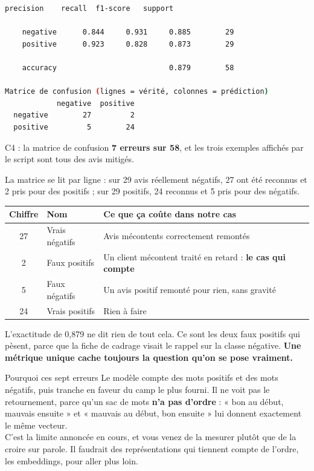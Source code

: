 \documentclass[11pt,a4paper]{article}
\begin{document}
\begin{lstlisting}[language=bash]
              precision    recall  f1-score   support

    negative      0.844     0.931     0.885        29
    positive      0.923     0.828     0.873        29

    accuracy                          0.879        58

Matrice de confusion (lignes = vérité, colonnes = prédiction)
            negative  positive
  negative        27         2
  positive         5        24
\end{lstlisting}

\begin{controle}{C4 : la matrice de confusion}
\textbf{7 erreurs sur 58}, et les trois exemples affichés par le script sont tous des avis mitigés.
\end{controle}

La matrice se lit par ligne : sur 29 avis réellement négatifs, 27 ont été reconnus et 2 pris pour des
positifs ; sur 29 positifs, 24 reconnus et 5 pris pour des négatifs.

\begin{center}
\begin{tabular}{@{}cp{3.4cm}p{9.6cm}@{}}
\toprule
\textbf{Chiffre} & \textbf{Nom} & \textbf{Ce que ça coûte dans notre cas} \\
\midrule
27 & Vrais négatifs & Avis mécontents correctement remontés \\
2 & Faux positifs & Un client mécontent traité en retard : \textbf{le cas qui compte} \\
5 & Faux négatifs & Un avis positif remonté pour rien, sans gravité \\
24 & Vrais positifs & Rien à faire \\
\bottomrule
\end{tabular}
\end{center}

L'exactitude de 0,879 ne dit rien de tout cela. Ce sont les deux faux positifs qui pèsent, parce que
la fiche de cadrage visait le rappel sur la classe négative. \textbf{Une métrique unique cache
toujours la question qu'on se pose vraiment.}

\begin{piege}{Pourquoi ces sept erreurs}
Le modèle compte des mots positifs et des mots négatifs, puis tranche en faveur du camp le plus
fourni. Il ne voit pas le retournement, parce qu'un sac de mots \textbf{n'a pas d'ordre} : « bon au
début, mauvais ensuite » et « mauvais au début, bon ensuite » lui donnent exactement le même vecteur.
\\[4pt]
C'est la limite annoncée en cours, et vous venez de la mesurer plutôt que de la croire sur parole.
Il faudrait des représentations qui tiennent compte de l'ordre, les embeddings, pour aller plus loin.
\end{piege}
\end{document}

